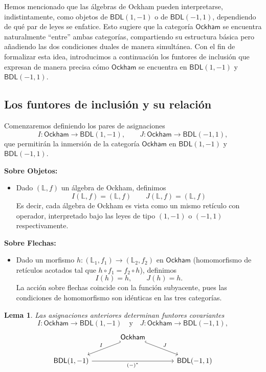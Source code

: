 \documentclass[12pt]{book}
\newtheorem{lemma}[theorem]{Lema}
\newcommand{\BDL}{\mathsf{BDL}}
\newcommand{\Ock}{\mathsf{Ockham}}
\begin{document}
Hemos mencionado que las álgebras de Ockham pueden interpretarse, indistintamente, como objetos de $\BDL(1,-1)$ o de $\BDL(-1,1)$, dependiendo de qué par de leyes se enfatice.
Esto sugiere que la categoría $\Ock$ se encuentra naturalmente “entre” ambas categorías, compartiendo su estructura básica pero añadiendo las dos condiciones duales de manera simultánea.
Con el fin de formalizar esta idea, introducimos a continuación los funtores de inclusión que expresan de manera precisa cómo $\Ock$ se encuentra en $\BDL(1,-1)$ y $\BDL(-1,1)$.


\subsection{Los funtores de inclusión y su relación}

Comenzaremos definiendo los pares de asignaciones
\[
I \colon \Ock \longrightarrow \BDL(1,-1),
\qquad
J \colon \Ock \longrightarrow \BDL(-1,1),
\]
que permitirán la inmersión de la categoría $\Ock$ en
$\BDL(1,-1)$ y $\BDL(-1,1)$.

\noindent\textbf{Sobre Objetos:}
\begin{itemize}
  \item Dado $(\mathbb{L},f)$ un álgebra de Ockham, definimos
  \[
  I(\mathbb{L},f) = (\mathbb{L},f)
  \qquad
  J(\mathbb{L},f) = (\mathbb{L},f)
  \]
  Es decir, cada álgebra de Ockham es vista como un mismo retículo
  con operador, interpretado bajo las leyes de tipo $(1,-1)$ o $(-1,1)$ respectivamente.
\end{itemize}

\noindent\textbf{Sobre Flechas:}
\begin{itemize}
  \item Dado un morfismo $h\colon(\mathbb{L}_1,f_1)\to(\mathbb{L}_2,f_2)$ en $\Ock$
  (homomorfismo de retículos acotados tal que $h\circ f_1 = f_2\circ h$),
  definimos
  \[
  I(h)=h,\qquad J(h)=h.
  \]
  La acción sobre flechas coincide con la función subyacente, pues
  las condiciones de homomorfismo son idénticas en las tres categorías.
\end{itemize}

\begin{lemma}\label{lem:funtores-I-J}
Las asignaciones anteriores determinan funtores covariantes
\[
I\colon \Ock\to\BDL(1,-1)
\quad\text{y}\quad
J\colon \Ock\to\BDL(-1,1),
\]
\[
\begin{tikzcd}[column sep=large]
& \Ock \arrow[dl,hook',swap,"I"] \arrow[dr,hook,"J"] & \\
\BDL(1,-1) \arrow[rr,"(-)^*"'] && \BDL(-1,1)
\end{tikzcd}
\]
\end{lemma}
\end{document}
